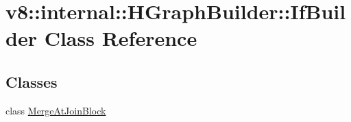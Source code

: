 \hypertarget{classv8_1_1internal_1_1_h_graph_builder_1_1_if_builder}{}\section{v8\+:\+:internal\+:\+:H\+Graph\+Builder\+:\+:If\+Builder Class Reference}
\label{classv8_1_1internal_1_1_h_graph_builder_1_1_if_builder}
\subsection*{Classes}
\begin{DoxyCompactItemize}
\item 
class \hyperlink{classv8_1_1internal_1_1_h_graph_builder_1_1_if_builder_1_1_merge_at_join_block}{Merge\+At\+Join\+Block}
\end{DoxyCompactItemize}
